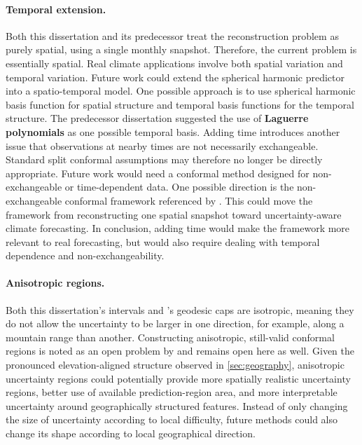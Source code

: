 \documentclass[11pt,a4paper]{report}
\begin{document}
\paragraph{Temporal extension.} Both this dissertation and its predecessor treat the reconstruction problem as purely spatial, using a single monthly snapshot. Therefore, the current problem is essentially spatial. Real climate applications involve both spatial variation and temporal variation. Future work could extend the spherical harmonic predictor into a spatio-temporal model. One possible approach is to use spherical harmonic basis function for spatial structure and temporal basis functions for the temporal structure. The predecessor dissertation suggested the use of \textbf{Laguerre polynomials} as one possible temporal basis. Adding time introduces another issue that observations at nearby times are not necessarily exchangeable. Standard split conformal assumptions may therefore no longer be directly appropriate. Future work would need a conformal method designed for non-exchangeable or time-dependent data. One possible direction is the non-exchangeable conformal framework referenced by \citeauthor{amirishahbazi2026}. This could move the framework from reconstructing one spatial snapshot toward uncertainty-aware climate forecasting. In conclusion, adding time would make the framework more relevant to real forecasting, but would also require dealing with temporal dependence and non-exchangeability.

\paragraph{Anisotropic regions.} Both this dissertation's intervals and \citeauthor{amirishahbazi2026}'s geodesic caps are isotropic, meaning they do not allow the uncertainty to be larger in one direction, for example, along a mountain range than another. Constructing anisotropic, still-valid conformal regions is noted as an open problem by \citeauthor{amirishahbazi2026} and remains open here as well. Given the pronounced elevation-aligned structure observed in \cref{sec:geography}, anisotropic uncertainty regions could potentially provide more spatially realistic uncertainty regions, better use of available prediction-region area, and more interpretable uncertainty around geographically structured features. Instead of only changing the size of uncertainty according to local difficulty, future methods could also change its shape according to local geographical direction.
\end{document}
